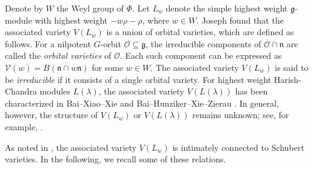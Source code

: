 \documentclass[11pt, reqno]{amsart}
\newcommand{\Ann}{\operatorname{Ann}}
\theoremstyle{definition}
\numberwithin{equation}{section}
\begin{document}

Denote
by $W$ the Weyl group of $\Phi$. Let $L_w$ denote the simple highest weight $\mathfrak{g}$-module with highest weight $-w\rho-\rho$, where $w\in W$.  
Joseph \cite{Jo84} found that the associated variety $V(L_w)$ is a union of orbital varieties, which are defined as follows. For a nilpotent $G$-orbit $\mathcal{O}\subseteq \mathfrak{g}$, the irreducible components of $\overline{\mathcal{O}}\cap \mathfrak{n}$ are called the {\it orbital varieties} of $\mathcal{O}$. Each such component can be expressed as $\mathcal{V}(w)=\overline{B(\mathfrak{n}\cap w\mathfrak{n})}$ for some $w\in W$. The associated variety $V(L_w)$ is said to be {\it irreducible} if it consists of a single orbital variety. For highest weight Harish-Chandra modules $L(\lambda)$, the associated variety $V(L(\lambda))$ has been characterized in Bai--Xiao--Xie \cite{BXX} and Bai--Hunziker--Xie--Zierau \cite{BHXZ}.  In general, however, the structure of $V(L_w)$ or $V(L(\lambda))$ remains unknown; see, for example, \cite{BoB3,Ta,Wi}. 


As noted in \cite{BoB3}, the associated variety $V(L_w)$ is intimately connected to Schubert varieties. In the following, we recall some of these relations.
\end{document}
